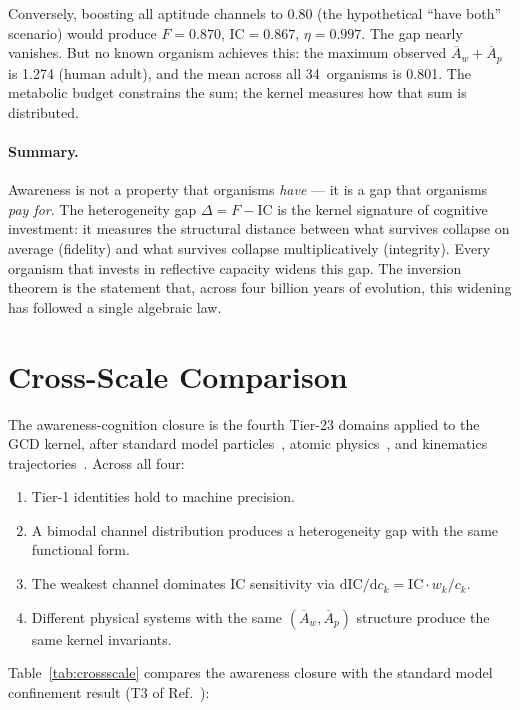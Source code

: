 \documentclass[
  aps,
  prd,
  twocolumn,
  superscriptaddress,
  nofootinbib,
  floatfix
]{revtex4-2}
\newcommand{\dd}{\mathrm{d}}
\newcommand{\IC}{\mathrm{IC}}
\newcommand{\Aw}{\overline{A}_{\!w}}
\newcommand{\Ap}{\overline{A}_{\!p}}
\begin{document}
Conversely, boosting all aptitude channels to $0.80$
(the hypothetical ``have both'' scenario) would produce
$F = 0.870$, $\IC = 0.867$, $\eta = 0.997$.  The gap
nearly vanishes.  But no known organism achieves this:
the maximum observed $\Aw + \Ap$ is 1.274 (human adult),
and the mean across all 34~organisms is 0.801.  The
metabolic budget constrains the sum; the kernel measures
how that sum is distributed.

\paragraph{Summary.}
Awareness is not a property that organisms \emph{have} ---
it is a gap that organisms \emph{pay for}.  The heterogeneity
gap $\Delta = F - \IC$ is the kernel signature of cognitive
investment: it measures the structural distance between what
survives collapse on average (fidelity) and what survives
collapse multiplicatively (integrity).  Every organism that
invests in reflective capacity widens this gap.  The inversion
theorem is the statement that, across four billion years of
evolution, this widening has followed a single algebraic law.

\section{Cross-Scale Comparison}\label{sec:crossscale}

The awareness-cognition closure is the fourth Tier-23 domains
applied to the GCD kernel, after standard model
particles~\cite{paulus2026sm}, atomic
physics~\cite{paulus2025physicscoherence}, and kinematics
trajectories~\cite{paulus2026kinematics}.  Across all four:

\begin{enumerate}
\item Tier-1 identities hold to machine precision.
\item A bimodal channel distribution produces a heterogeneity
  gap with the same functional form.
\item The weakest channel dominates $\IC$ sensitivity via
  $\dd\IC/\dd c_k = \IC \cdot w_k / c_k$.
\item Different physical systems with the same $(\Aw, \Ap)$
  structure produce the same kernel invariants.
\end{enumerate}

Table~\ref{tab:crossscale} compares the awareness closure
with the standard model confinement result (T3 of
Ref.~\cite{paulus2026sm}):
\end{document}
